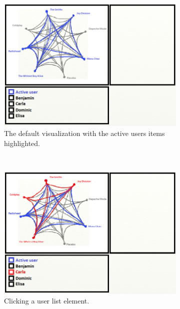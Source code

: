 \begin{figure}
	\centering
	\begin{subfigure}[b]{0.3\textwidth}
					\centering
					\includegraphics[width=\textwidth]{img/paper_prototype_default}
					\caption{The default visualization with the active users items highlighted.}
					\label{figure:paper_prototype_default}
	\end{subfigure}%
	~
	\begin{subfigure}[b]{0.3\textwidth}
					\centering
					\includegraphics[width=\textwidth]{img/paper_prototype_user_click}
					\caption{Clicking a user list element.}
					\label{figure:paper_prototype_user_click}
	\end{subfigure}
	~
	\begin{subfigure}[b]{0.3\textwidth}

\end{subfigure}
\end{figure}
